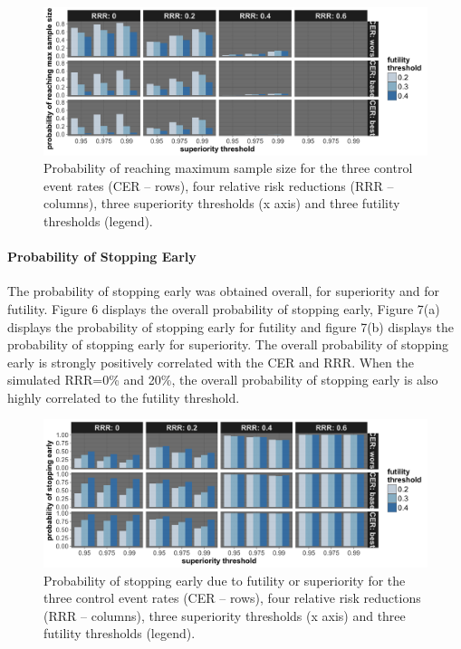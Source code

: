 \documentclass[]{article}
\let\oldparagraph\paragraph
\renewcommand{\paragraph}[1]{\oldparagraph{#1}\mbox{}}
\begin{document}
\begin{figure}
  \caption{Probability of reaching maximum sample size for the three control event rates (CER – rows), four relative
  risk reductions (RRR – columns), three superiority thresholds (x axis) and three futility thresholds (legend).}
  \includegraphics{../plots/stop_p1_new/reachmax_sim_05_stopp1_new.png}
\end{figure}

\hypertarget{probability-of-stopping-early}{%
\paragraph{Probability of Stopping
Early}\label{probability-of-stopping-early}}

The probability of stopping early was obtained overall, for superiority
and for futility. Figure 6 displays the overall probability of stopping
early, Figure 7(a) displays the probability of stopping early for
futility and figure 7(b) displays the probability of stopping early for
superiority. The overall probability of stopping early is strongly
positively correlated with the CER and RRR. When the simulated RRR=0\%
and 20\%, the overall probability of stopping early is also highly
correlated to the futility threshold.

\begin{figure}
  \caption{Probability of stopping early due to futility or superiority for the three control event rates (CER – rows),
  four relative risk reductions (RRR – columns), three superiority thresholds (x axis) and three futility thresholds
  (legend).}
  \includegraphics{../plots/stop_p1_new/early_sim_05_stopp1_new.png}
\end{figure}
\end{document}
